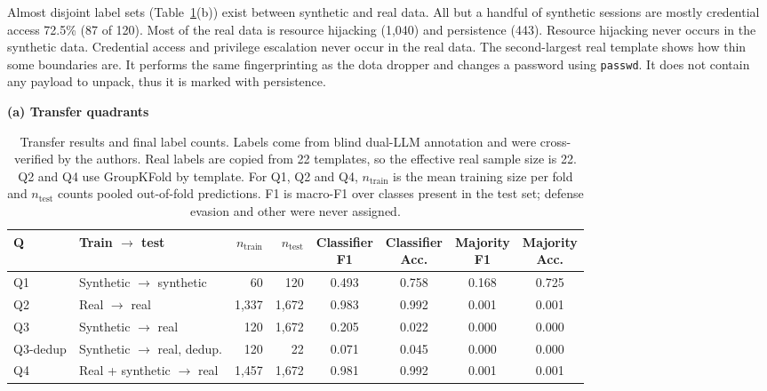 \documentclass[runningheads]{llncs}
\begin{document}
Almost disjoint label sets (Table~\ref{tab:transfer}(b)) exist between synthetic and real data. All but a handful of synthetic sessions are mostly credential access 72.5\% (87 of 120). Most of the real data is resource hijacking (1,040) and persistence (443). Resource hijacking never occurs in the synthetic data. Credential access and privilege escalation never occur in the real data. The second-largest real template shows how thin some boundaries are. It performs the same fingerprinting as the dota dropper and changes a password using \texttt{passwd}. It does not contain any payload to unpack, thus it is marked with persistence.

\begin{table}[t]
\caption{Transfer results and final label counts. Labels come from blind dual-LLM annotation and were cross-verified by the authors. Real labels are copied from 22 templates, so the effective real sample size is 22. Q2 and Q4 use GroupKFold by template. For Q1, Q2 and Q4, $n_{\mathrm{train}}$ is the mean training size per fold and $n_{\mathrm{test}}$ counts pooled out-of-fold predictions. F1 is macro-F1 over classes present in the test set; defense evasion and other were never assigned.}\label{tab:transfer}
\centering
\scriptsize
\textbf{(a) Transfer quadrants}\\[3pt]
\setlength{\tabcolsep}{3pt}
\begin{tabular}{@{}llrrcccc@{}}
\toprule
Q & Train $\rightarrow$ test & $n_{\mathrm{train}}$ & $n_{\mathrm{test}}$ &
\thead{Classifier\\F1} & \thead{Classifier\\Acc.} & \thead{Majority\\F1} & \thead{Majority\\Acc.} \\
\midrule
Q1       & Synthetic $\rightarrow$ synthetic        & 60    & 120   & 0.493 & 0.758 & 0.168 & 0.725 \\
Q2       & Real $\rightarrow$ real                  & 1,337 & 1,672 & 0.983 & 0.992 & 0.001 & 0.001 \\
Q3       & Synthetic $\rightarrow$ real             & 120   & 1,672 & 0.205 & 0.022 & 0.000 & 0.000 \\
Q3-dedup & Synthetic $\rightarrow$ real, dedup.     & 120   & 22    & 0.071 & 0.045 & 0.000 & 0.000 \\
Q4       & Real + synthetic $\rightarrow$ real      & 1,457 & 1,672 & 0.981 & 0.992 & 0.001 & 0.001 \\
\bottomrule
\end{tabular}


\end{table}
\end{document}
